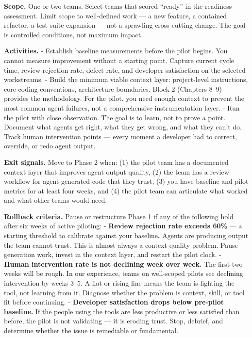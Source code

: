 \documentclass[
  a4paper,
  DIV=11,
  numbers=noendperiod]{scrreprt}
\begin{document}
\textbf{Scope.} One or two teams. Select teams that scored ``ready'' in
the readiness assessment. Limit scope to well-defined work --- a new
feature, a contained refactor, a test suite expansion --- not a
sprawling cross-cutting change. The goal is controlled conditions, not
maximum impact.

\textbf{Activities.} - Establish baseline measurements before the pilot
begins. You cannot measure improvement without a starting point. Capture
current cycle time, review rejection rate, defect rate, and developer
satisfaction on the selected workstreams. - Build the minimum viable
context layer: project-level instructions, core coding conventions,
architecture boundaries. Block 2 (Chapters 8--9) provides the
methodology. For the pilot, you need enough context to prevent the most
common agent failures, not a comprehensive instrumentation layer. - Run
the pilot with close observation. The goal is to learn, not to prove a
point. Document what agents get right, what they get wrong, and what
they can't do. Track human intervention points --- every moment a
developer had to correct, override, or redo agent output.

\textbf{Exit signals.} Move to Phase 2 when: (1) the pilot team has a
documented context layer that improves agent output quality, (2) the
team has a review workflow for agent-generated code that they trust, (3)
you have baseline and pilot metrics for at least four weeks, and (4) the
pilot team can articulate what worked and what other teams would need.

\textbf{Rollback criteria.} Pause or restructure Phase 1 if any of the
following hold after six weeks of active piloting: - \textbf{Review
rejection rate exceeds 60\%} --- a starting threshold to calibrate
against your baseline\textbf{.} Agents are producing output the team
cannot trust. This is almost always a context quality problem. Pause
generation work, invest in the context layer, and restart the pilot
clock. - \textbf{Human intervention rate is not declining week over
week.} The first two weeks will be rough. In our experience, teams on
well-scoped pilots see declining intervention by weeks 3--5. A flat or
rising line means the team is fighting the tool, not learning from it.
Diagnose whether the problem is context, skill, or tool fit before
continuing. - \textbf{Developer satisfaction drops below pre-pilot
baseline.} If the people using the tools are less productive or less
satisfied than before, the pilot is not validating --- it is eroding
trust. Stop, debrief, and determine whether the issue is remediable or
fundamental.
\end{document}
